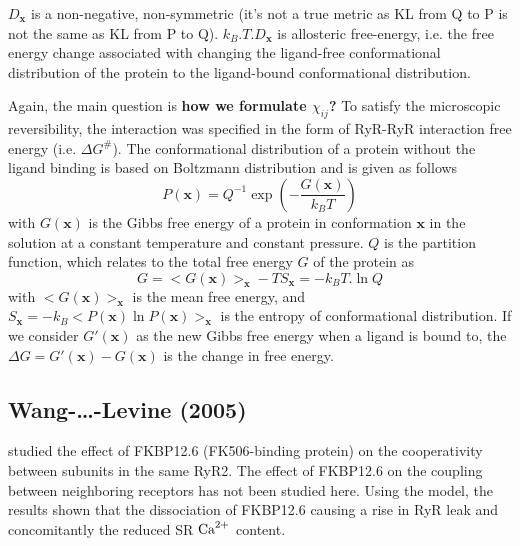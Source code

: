 $D_\mathbf{x}$ is a non-negative, non-symmetric (it's not a true metric as KL from Q to P
is not the same as KL from P to Q). $k_B.T.D_\mathbf{x}$ is allosteric free-energy, i.e.
the free energy change associated with changing the ligand-free conformational
distribution of the protein to the ligand-bound conformational distribution.

Again, the main question is {\bf how we formulate $\chi_{ij}$?} To satisfy the
microscopic reversibility, the interaction was specified in the form of RyR-RyR
interaction free energy (i.e. $\Delta G^\#$). The conformational distribution
of a protein without the ligand binding is based on Boltzmann distribution and
is given as follows ~\citep{wall2006}
\begin{equation}
  \label{eq:1213}
  P(\mathbf{x}) = Q^{-1} \exp(-\frac{ G(\mathbf{x})}{k_BT})
\end{equation}
with $G(\mathbf{x})$ is the Gibbs free energy of a
protein in conformation $\mathbf{x}$ in the solution at a constant temperature and
constant pressure. $Q$ is the partition function, which relates to the total free
energy $G$ of the protein as
\begin{equation}
  \label{eq:1214}
  G = < G(\mathbf{x})>_\mathbf{x} - TS_\mathbf{x} = -k_BT.\ln Q
\end{equation}
with $< G(\mathbf{x})>_\mathbf{x}$ is the mean free energy, and
$S_\mathbf{x}=-k_B<P(\mathbf{x})\ln P(\mathbf{x})>_\mathbf{x}$ is the entropy of conformational distribution.
If we consider $G'(\mathbf{x})$ as the new Gibbs free energy when a ligand is
bound to, the $\Delta G=G'(\mathbf{x}) - G(\mathbf{x})$ is the change in free
energy.

\subsection{Wang-\ldots-Levine (2005)}
\label{sec:wang-levine2005_RYR}

\citep{wang2005ecc} studied the effect of FKBP12.6 (FK506-binding protein) on
the cooperativity between subunits in the same RyR2. The effect of FKBP12.6 on
the coupling between neighboring receptors has not been studied here. Using
the model, the results shown that the dissociation of FKBP12.6 causing a rise in
RyR leak and concomitantly the reduced SR ${\text{Ca}^{2+}}$ content.

